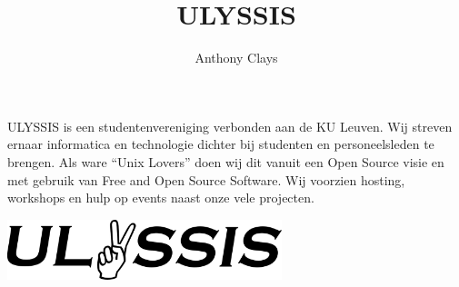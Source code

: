 \documentclass[11pt]{article}
\title{ULYSSIS}
\author{Anthony Clays}
\begin{document}
\maketitle

ULYSSIS is een studentenvereniging verbonden aan de KU Leuven.
Wij streven ernaar informatica en technologie dichter bij studenten en personeelsleden te brengen.
Als ware ``Unix Lovers'' doen wij dit vanuit een Open Source visie en met gebruik van Free and Open Source Software.
Wij voorzien hosting, workshops en hulp op events naast onze vele projecten.

\includegraphics[width=0.6\textwidth]{ulyssis.png}
\end{document}
